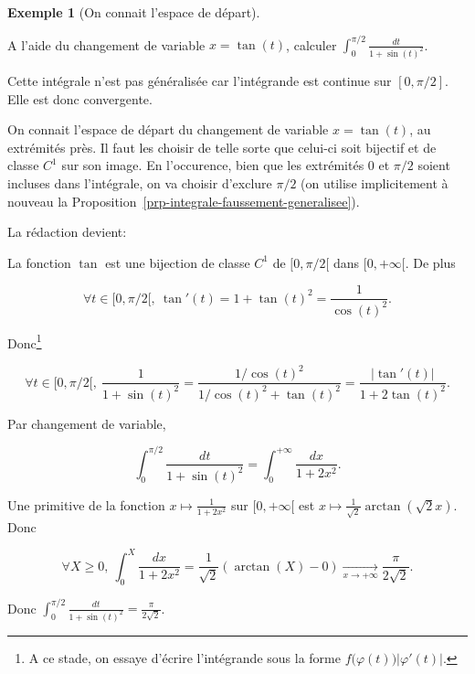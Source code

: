 \documentclass[
  french,
  letterpaper,
  DIV=11,
  numbers=noendperiod]{scrreprt}
\theoremstyle{plain}
\theoremstyle{definition}
\theoremstyle{plain}
\theoremstyle{plain}
\theoremstyle{definition}
\theoremstyle{definition}
\newtheorem{example}{Exemple}[chapter]
\theoremstyle{plain}
\theoremstyle{remark}
\begin{document}
\begin{example}[On connait l'espace de
départ]\protect\hypertarget{exm-espace-depart-arrivee}{}\label{exm-espace-depart-arrivee}

A l'aide du changement de variable \(x=\tan(t)\), calculer
\(\int_{0}^{\pi/2}\frac{dt}{1+\sin(t)^{2}}\).

Cette intégrale n'est pas généralisée car l'intégrande est continue sur
\([0,\pi/2]\). Elle est donc convergente.

On connait l'espace de départ du changement de variable \(x=\tan(t)\),
au extrémités près. Il faut les choisir de telle sorte que celui-ci soit
bijectif et de classe \(C^{1}\) sur son image. En l'occurence, bien que
les extrémités \(0\) et \(\pi/2\) soient incluses dans l'intégrale, on
va choisir d'exclure \(\pi/2\) (on utilise implicitement à nouveau la
Proposition~\ref{prp-integrale-faussement-generalisee}).

La rédaction devient:

La fonction \(\tan\) est une bijection de classe \(C^{1}\) de
\([0,\pi/2[\) dans \([0,+\infty[\). De plus

\[
    \forall t \in [0,\pi/2[,\ \tan'(t) = 1+\tan(t)^{2} = \frac{1}{\cos(t)^{2}}.
\]

Donc\footnote{A ce stade, on essaye d'écrire l'intégrande sous la forme
  \(f\bigl(\varphi(t)\bigr)|\varphi'(t)|\).}

\[
    \forall t \in [0,\pi/2[,\ \frac{1}{1+\sin(t)^{2}}
=\frac{1/\cos(t)^{2}}{1/\cos(t)^{2} + \tan(t)^{2}}=\frac{|\tan'(t)|}{1+2
\tan(t)^{2}}.
\]

Par changement de variable,

\[
    \int_{0}^{\pi/2}\frac{dt}{1+\sin(t)^2} = \int_{0}^{+\infty}\frac{dx}{1+2x^{2}}.
\]

Une primitive de la fonction \(x \mapsto \frac{1}{1+2x^{2}}\) sur
\([0,+\infty[\) est \(x \mapsto \frac{1}{\sqrt{2}}\arctan(\sqrt{2}x)\).
Donc

\[
    \forall X \geqslant 0,\ \int_{0}^{X}\frac{dx}{1+2x^{2}}=
\frac{1}{\sqrt{2}}\left(\arctan(X)-0\right) \underset{x \to +\infty}{\longrightarrow}
\frac{\pi}{2\sqrt{2}}.
\]

Donc
\(\int_{0}^{\pi/2}\frac{dt}{1+\sin(t)^{2}}=\frac{\pi}{2 \sqrt{2}}\).

\end{example}
\end{document}
